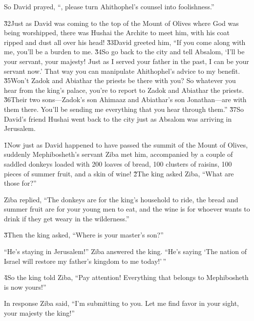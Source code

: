 So David prayed, ``, please turn Ahithophel's counsel into foolishness.''

\v{32}Just as David was coming to the top of the Mount of Olives where God was being worshipped, there was Hushai the Archite to meet him, with his coat ripped and dust all over his head! \v{33}David greeted him, ``If you come along with me, you'll be a burden to me. \v{34}So go back to the city and tell Absalom, `I'll be your servant, your majesty! Just as I served your father in the past, I can be your servant now.' That way you can manipulate Ahithophel's advice to my benefit. \v{35}Won't Zadok and Abiathar the priests be there with you? So whatever you hear from the king's palace, you're to report to Zadok and Abiathar the priests. \v{36}Their two sons---Zadok's son Ahimaaz and Abiathar's son Jonathan---are with them there. You'll be sending me everything that you hear through them.'' \v{37}So David's friend Hushai went back to the city just as Absalom was arriving in Jerusalem.

\v{1}Now just as David happened to have passed the summit of the Mount of Olives, suddenly Mephibosheth's servant Ziba met him, accompanied by a couple of saddled donkeys loaded with 200 loaves of bread, 100 clusters of raisins, 100 pieces of summer fruit, and a skin of wine! \v{2}The king asked Ziba, ``What are those for?''

Ziba replied, ``The donkeys are for the king's household to ride, the bread and summer fruit are for your young men to eat, and the wine is for whoever wants to drink if they get weary in the wilderness.''

\v{3}Then the king asked, ``Where is your master's son?''

``He's staying in Jerusalem!'' Ziba answered the king. ``He's saying `The nation of Israel will restore my father's kingdom to me today!'\,''

\v{4}So the king told Ziba, ``Pay attention! Everything that belongs to Mephibosheth is now yours!''

In response Ziba said, ``I'm submitting to you. Let me find favor in your sight, your majesty the king!''

